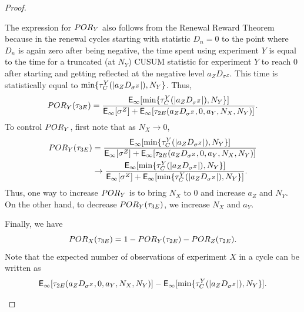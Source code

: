 \documentclass[10pt,a4paper]{amsart}
\begin{document}
\begin{proof}
\begin{enumerate}
The expression for $\textup{POR}_Y$ also follows from the Renewal Reward Theorem because in the renewal cycles starting with statistic $D_n=0$ to the point where $D_n$ is again zero after being negative, the time spent using experiment $Y$ is equal to the time for a truncated (at $N_Y$) CUSUM statistic for experiment $Y$ to reach $0$ after starting and getting reflected at the negative level $a_Z D_{\sigma^Z}$. This time is statistically equal to $\min \{ \tau_{\textup{\fontsize{6 pt}{10 pt}\selectfont C}}^Y (\vert a_Z D_{\sigma^Z} \vert), N_Y \}$. Thus,
\begin{align*}
 \textup{POR}_Y (\tau_{\textup{\fontsize{6 pt}{10 pt}\selectfont 3E}}) = \frac{\mathsf{E}_\infty [\min \{ \tau_{\textup{\fontsize{6 pt}{10 pt}\selectfont C}}^Y (\vert a_Z D_{\sigma^Z} \vert), N_Y \}]}{\mathsf{E}_\infty [\sigma^Z] + \mathsf{E}_\infty [\tau_{\textup{\fontsize{6 pt}{10 pt}\selectfont 2E}}(a_Z D_{\sigma^Z}, 0, a_Y, N_X, N_Y)]}.
\end{align*}
To control $\textup{POR}_Y$, first note that as $N_X \to 0$,
\begin{align*}
 \textup{POR}_Y (\tau_{\textup{\fontsize{6 pt}{10 pt}\selectfont 3E}}) &= \frac{\mathsf{E}_\infty [\min \{ \tau_{\textup{\fontsize{6 pt}{10 pt}\selectfont C}}^Y (\vert a_Z D_{\sigma^Z} \vert), N_Y \}]}{\mathsf{E}_\infty [\sigma^Z] + \mathsf{E}_\infty [\tau_{\textup{\fontsize{6 pt}{10 pt}\selectfont 2E}}(a_Z D_{\sigma^Z}, 0, a_Y, N_X, N_Y)]} \\
& \to \frac{\mathsf{E}_\infty [\min \{ \tau_{\textup{\fontsize{6 pt}{10 pt}\selectfont C}}^Y (\vert a_Z D_{\sigma^Z} \vert), N_Y \}]}{\mathsf{E}_\infty [\sigma^Z] + \mathsf{E}_\infty [\min \{ \tau_{\textup{\fontsize{6 pt}{10 pt}\selectfont C}}^Y (\vert a_Z D_{\sigma^Z} \vert), N_Y \}]}.
\end{align*}
Thus, one way to increase $\textup{POR}_Y$ is to bring $N_X$ to $0$ and increase $a_Z$ and $N_Y$. On the other hand, to decrease $\textup{POR}_Y (\tau_{\textup{\fontsize{6 pt}{10 pt}\selectfont 3E}})$, we increase $N_X$ and $a_Y$. 

\medskip

Finally, we have
$$ \textup{POR}_X (\tau_{\textup{\fontsize{6 pt}{10 pt}\selectfont 3E}}) = 1 - \textup{POR}_Y (\tau_{\textup{\fontsize{6 pt}{10 pt}\selectfont 2E}}) - \textup{POR}_Z (\tau_{\textup{\fontsize{6 pt}{10 pt}\selectfont 2E}}). $$
Note that the expected number of observations of experiment $X$ in a cycle can be written as
\begin{align*}
 \mathsf{E}_\infty [\tau_{\textup{\fontsize{6 pt}{10 pt}\selectfont 2E}}(a_Z D_{\sigma^Z}, 0, a_Y, N_X, N_Y)]  - \mathsf{E}_\infty [\min \{ \tau_{\textup{\fontsize{6 pt}{10 pt}\selectfont C}}^Y (\vert a_Z D_{\sigma^Z} \vert), N_Y \}].
\end{align*}


\end{enumerate}
\end{proof}
\end{document}
